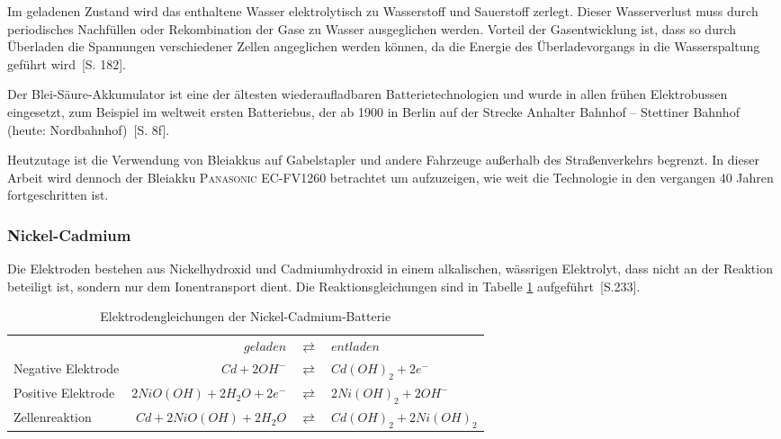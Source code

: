 Im geladenen Zustand wird das enthaltene Wasser elektrolytisch zu Wasserstoff und Sauerstoff zerlegt. Dieser Wasserverlust muss durch periodisches Nachfüllen oder Rekombination der Gase zu Wasser ausgeglichen werden. Vorteil der Gasentwicklung ist, dass so durch Überladen die Spannungen verschiedener Zellen angeglichen werden können, da die Energie des Überladevorgangs in die Wasserspaltung geführt wird~\cite{tub_aleph001746639}[S. 182].

Der Blei-Säure-Akkumulator ist eine der ältesten wiederaufladbaren Batterietechnologien und wurde in allen frühen Elektrobussen eingesetzt, zum Beispiel im weltweit ersten Batteriebus, der ab 1900 in Berlin auf der Strecke Anhalter Bahnhof – Stettiner Bahnhof (heute: Nordbahnhof)~\cite{Risch:1957}[S. 8f].

Heutzutage ist die Verwendung von Bleiakkus auf Gabelstapler und andere Fahrzeuge außerhalb des Straßenverkehrs begrenzt. In dieser Arbeit wird dennoch der Bleiakku \textsc{Panasonic EC-FV1260} betrachtet um aufzuzeigen, wie weit die Technologie in den vergangen 40 Jahren fortgeschritten ist.

\subsubsection{Nickel-Cadmium}
Die Elektroden bestehen aus Nickelhydroxid und Cadmiumhydroxid in einem alkalischen, wässrigen Elektrolyt, dass nicht an der Reaktion beteiligt ist, sondern nur dem Ionentransport dient. Die Reaktionsgleichungen sind in Tabelle \ref{NiCd} aufgeführt~\cite{Sterner:2014}[S.233].

\begin{table}\centering
	\begin{tabularx}{\linewidth}{XrcX}
		\toprule
		&               $geladen$ & $\rightleftarrows$ & $entladen$             \\
		Negative Elektrode &            $Cd + 2OH^-$ & $\rightleftarrows$ & $Cd(OH)_2 + 2e^-$      \\
		Positive Elektrode & $2NiO(OH) + 2H_2O + 2e^-$ & $\rightleftarrows$ & $2Ni(OH)_2 + 2OH^-$    \\ \midrule
		Zellenreaktion     &   $Cd + 2NiO(OH) + 2H_2O$ & $\rightleftarrows$ & $Cd(OH)_2 + 2Ni(OH)_2$ \\ \bottomrule
	\end{tabularx}
	\caption{Elektrodengleichungen der Nickel-Cadmium-Batterie}
	\label{NiCd}
\end{table}

